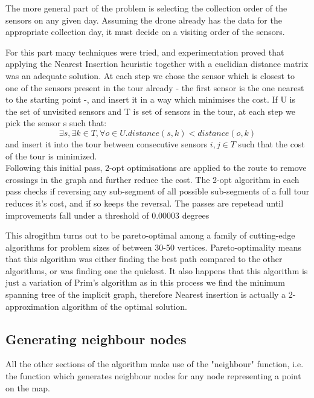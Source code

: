 \documentclass[10pt,a4paper]{article}
\begin{document}
The more general part of the problem is selecting the collection order of the sensors on any given day.
Assuming the drone already has the data for the appropriate collection day, it must decide on a visiting order of the sensors.
\par 
For this part many techniques were tried, and experimentation proved that applying the Nearest Insertion heuristic together with a euclidian distance matrix was an adequate solution. 
At each step we chose the sensor which is closest to one of the sensors present in the tour already - the first sensor is the one nearest to the starting point -, and insert it in a way which minimises the cost.
If U is the set of unvisited sensors and T is set of sensors in the tour, at each step we pick the sensor s such that:
\begin{equation}
    \exists s,\exists k \in T,\forall o\in U.distance(s,k) < distance(o,k)
\end{equation} 
and insert it into the tour between consecutive sensors $i,j \in T$ such that the cost of the tour is minimized.
\\
Following this initial pass, 2-opt optimisations are applied to the route to remove crossings in the graph and further reduce the cost.
The 2-opt algorithm in each pass checks if reversing any sub-segment of all possible sub-segments of a full tour reduces it's cost, and if so keeps the reversal. 
The passes are repetead until improvements fall under a threshold of 0.00003 degrees

This alrogithm turns out to be pareto-optimal \cite{metric-tsp} among a family of cutting-edge algorithms for problem sizes of between 30-50 vertices.
Pareto-optimality means that this algorithm was either finding the best path compared to the other algorithms, or was finding one the quickest. It also happens that 
this algorithm is just a variation of Prim's algorithm as in this process we find the minimum spanning tree of the implicit graph, therefore Nearest insertion is actually a 
2-approximation algorithm \cite{2-approximation-ni} of the optimal solution.
\subsection{Generating neighbour nodes}
All the other sections of the algorithm make use of the "neighbour" function, i.e. the function which generates neighbour nodes for any node representing 
a point on the map.
\end{document}
